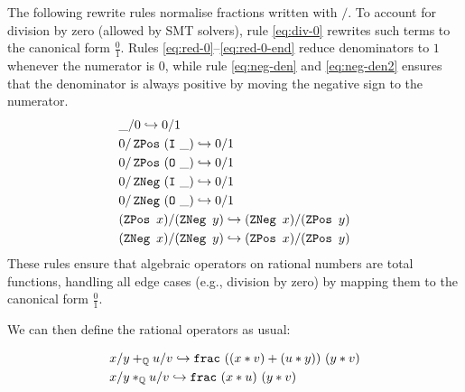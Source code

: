 \begin{definition}
The following rewrite rules normalise fractions written with $\slash$.
To account for division by zero (allowed by SMT solvers), rule \cref{eq:div-0} rewrites such terms to the canonical form $\tfrac{0}{1}$.
Rules \cref{eq:red-0}–\cref{eq:red-0-end} reduce denominators to $1$ whenever the numerator is $0$, while rule \cref{eq:neg-den} and \cref{eq:neg-den2} ensures that the denominator is always positive by moving the negative sign to the numerator.
\begin{align}
& \_ \slash 0 \hookrightarrow 0 \slash 1 \label{eq:div-0}\\
& 0 \slash \mathop{\texttt{ZPos}}~(\texttt{\upshape{I}}~\_) \hookrightarrow 0 \slash 1 \label{eq:red-0}\\
& 0 \slash \mathop{\texttt{ZPos}}~(\texttt{\upshape{O}}~\_) \hookrightarrow 0 \slash 1 \\
& 0 \slash \mathop{\texttt{ZNeg}}~(\texttt{\upshape{I}}~\_) \hookrightarrow 0 \slash 1 \\
& 0 \slash \mathop{\texttt{ZNeg}}~(\texttt{\upshape{O}}~\_) \hookrightarrow 0 \slash 1 \label{eq:red-0-end}\\
& (\mathop{\texttt{ZPos}}~x) \slash (\mathop{\texttt{ZNeg}}~y) \hookrightarrow (\mathop{\texttt{ZNeg}}~x) \slash (\mathop{\texttt{ZPos}}~y) \label{eq:neg-den}\\
& (\mathop{\texttt{ZNeg}}~x) \slash (\mathop{\texttt{ZNeg}}~y) \hookrightarrow (\mathop{\texttt{ZPos}}~x) \slash (\mathop{\texttt{ZPos}}~y) \label{eq:neg-den2}
\end{align}
These rules ensure that algebraic operators on rational numbers are total functions, handling all edge cases (e.g., division by zero) by mapping them to the canonical form $\frac{0}{1}$.
\end{definition}

We can then define the rational operators as usual:

\begin{definition}\label{def:ops-frac}
\begin{align}
&x \slash y +_\Q \index{$+_\Q$} u \slash v \re \kw{frac}~((x * v) + (u * y))~(y * v) \\
&x \slash y *_\Q \index{$*_\Q$} u \slash v \re \kw{frac}~(x * u)~(y * v)
\end{align}
\end{definition}




